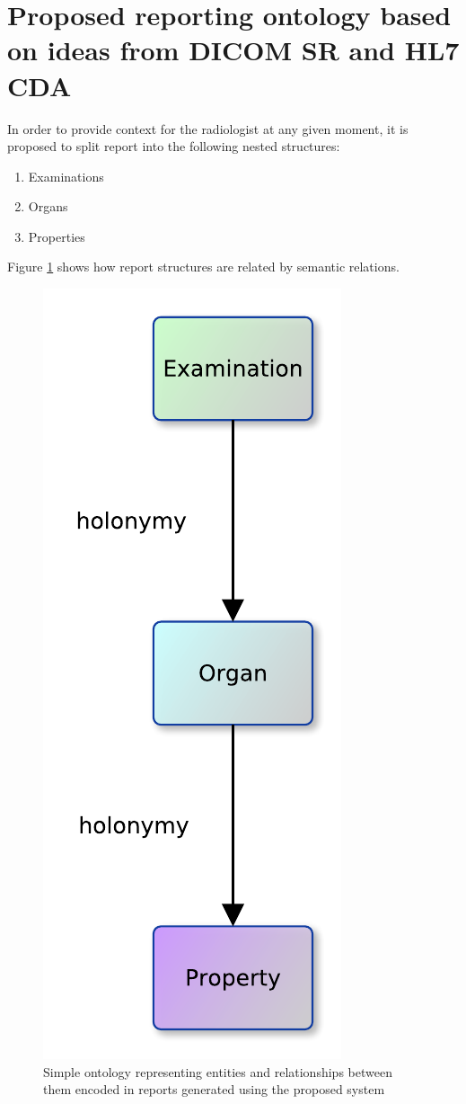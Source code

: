 \documentclass[12pt, twoside, openany]{report}
\theoremstyle{definition}
\begin{document}
\section{Proposed reporting ontology based on ideas from DICOM SR and HL7 CDA} \label{proposed-ontology}
In order to provide context for the radiologist at any given moment, it is proposed to split report into the following nested structures:
\begin{enumerate}
    \item Examinations 
    \item Organs 
    \item Properties 
\end{enumerate}
Figure \ref{fig:report-semantic} shows how report structures are related by semantic relations.
\begin{figure}
    \centering
    \includegraphics{report-semantic.pdf}
    \caption{Simple ontology representing entities and relationships between them encoded in reports generated using the proposed system
    \label{fig:report-semantic}}
\end{figure}
\end{document}
